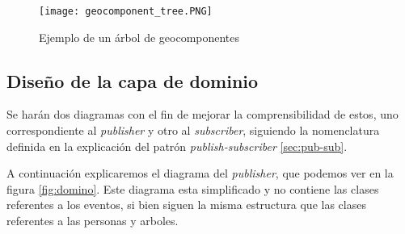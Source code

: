 \begin{figure}[ht!]
\center
\texttt{[image: geocomponent\_tree.PNG]}
\caption{Ejemplo de un árbol de geocomponentes}
\label{fig:location_line}
\end{figure}

\newpage

\subsection{Diseño de la capa de dominio}
Se harán dos diagramas con el fin de mejorar la comprensibilidad de estos, uno correspondiente al \textit{publisher} y otro al \textit{subscriber}, siguiendo la nomenclatura definida en la explicación del patrón \textit{publish-subscriber} \ref{sec:pub-sub}.

A continuación explicaremos el diagrama del \textit{publisher}, que podemos ver en la figura \ref{fig:domino}. Este diagrama esta simplificado y no contiene las clases referentes a los eventos, si bien siguen la misma estructura que las clases referentes a las personas y arboles.

